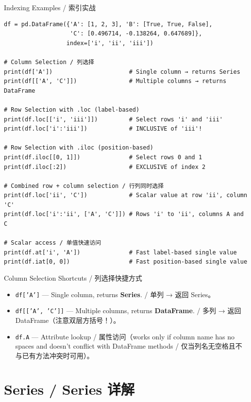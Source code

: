 \documentclass[11pt,a4paper]{report}
\let\oldtexttt\texttt
\renewcommand{\texttt}[1]{\textcolor{mainblue}{\oldtexttt{#1}}}
\begin{document}
\begin{examplebox}{Indexing Examples / 索引实战}
\begin{lstlisting}
df = pd.DataFrame({'A': [1, 2, 3], 'B': [True, True, False],
                   'C': [0.496714, -0.138264, 0.647689]},
                  index=['i', 'ii', 'iii'])

# Column Selection / 列选择
print(df['A'])                      # Single column → returns Series
print(df[['A', 'C']])               # Multiple columns → returns DataFrame

# Row Selection with .loc (label-based)
print(df.loc[['i', 'iii']])         # Select rows 'i' and 'iii'
print(df.loc['i':'iii'])            # INCLUSIVE of 'iii'!

# Row Selection with .iloc (position-based)
print(df.iloc[[0, 1]])              # Select rows 0 and 1
print(df.iloc[:2])                  # EXCLUSIVE of index 2

# Combined row + column selection / 行列同时选择
print(df.loc['ii', 'C'])            # Scalar value at row 'ii', column 'C'
print(df.loc['i':'ii', ['A', 'C']]) # Rows 'i' to 'ii', columns A and C

# Scalar access / 单值快速访问
print(df.at['i', 'A'])              # Fast label-based single value
print(df.iat[0, 0])                 # Fast position-based single value
\end{lstlisting}
\end{examplebox}

\begin{concept}{Column Selection Shortcuts / 列选择快捷方式}
    \begin{itemize}[itemsep=0.3em]
        \item \texttt{df['A']} — Single column, returns \textbf{Series}. / 单列 → 返回 Series。
        \item \texttt{df[['A', 'C']]} — Multiple columns, returns \textbf{DataFrame}. / 多列 → 返回 DataFrame（注意双层方括号！）。
        \item \texttt{df.A} — Attribute lookup / 属性访问（works only if column name has no spaces and doesn't conflict with DataFrame methods / 仅当列名无空格且不与已有方法冲突时可用）。
    \end{itemize}
\end{concept}

\section{Series / Series 详解}
\end{document}
